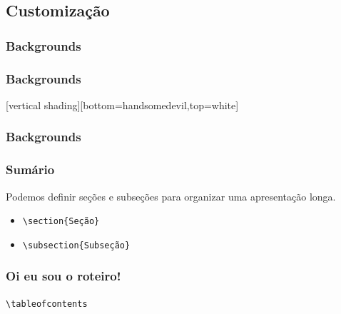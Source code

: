 \documentclass{beamer}
\newcommand{\kw}[1]{\textbackslash {\color{submerged}#1}}
\begin{document}
\subsection{Customização}

{%
   \begin{frame}%
      \frametitle{Backgrounds}%
      \vspace{5cm}
   \end{frame}
}

{%
   \begin{frame}%
      \frametitle{Backgrounds}%
      \vspace{5cm}
   \end{frame}
}

{%
   [vertical shading][bottom=handsomedevil,top=white]
   \begin{frame}%
      \frametitle{Backgrounds}%
      \vspace{5cm}
   \end{frame}
}

\begin{frame}
   \frametitle{Sumário}
   Podemos definir seções e subseções para organizar uma apresentação longa.
   \begin{itemize}
      \item {\tt{\kw{section}\{Seção\}}}
      \item {\tt{\kw{subsection}\{Subseção\}}}
   \end{itemize}      
   \begin{center}
      \lstset{frame=single}
   \end{center}
\end{frame}

\begin{frame}
   \frametitle{Oi eu sou o roteiro!}
   \tableofcontents
   \begin{center}
      {\tt{\kw{tableofcontents}}}
   \end{center}
\end{frame}
\end{document}
